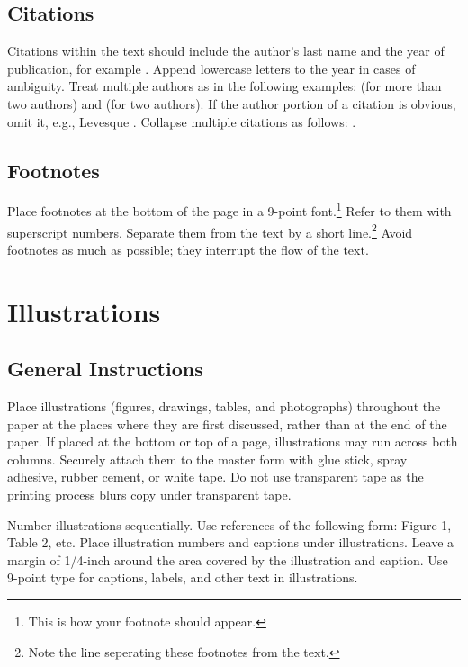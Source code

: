 \documentclass{article}
\begin{document}
\subsection{Citations}

Citations within the text should include the author's last name and
the year of publication, for example \cite{cheeseman:probability}.
Append lowercase letters to the year in cases of ambiguity.
Treat multiple authors as in the following examples:
\cite{abelson-et-al:scheme} (for more than two authors) and
\cite{brachman-schmolze:kl-one} (for two authors).
If the author portion of a citation is obvious, omit it,
e.g., Levesque .
Collapse multiple citations as follows:
\cite{levesque:functional-foundations,haugeland:mind-design}.%
\nocite{abelson-et-al:scheme}%
\nocite{brachman-schmolze:kl-one}%
\nocite{cheeseman:probability}%
\nocite{haugeland:mind-design}%
\nocite{lenat:heuristics}%
\nocite{levesque:functional-foundations}%
\nocite{levesque:belief}

\subsection{Footnotes} 
Place footnotes at the bottom of the page in a 9-point font.\footnote{This is how your footnote should appear.} 
Refer to them with superscript numbers. 
Separate them from the text by a short line.\footnote{Note the line seperating these footnotes from the text.}
Avoid footnotes as much as possible; they interrupt the flow of the text.

\section{Illustrations}

\subsection{General Instructions}
Place illustrations (figures, drawings, tables, and photographs) throughout the paper at the places where they are first discussed, rather than at the end of the paper. If placed at the bottom or top of a page, illustrations may run across
both columns. Securely attach them to the master form with glue stick, spray 
adhesive, rubber cement, or white tape. Do not use transparent tape as the 
printing process blurs copy under transparent tape.

Number illustrations sequentially. Use references of the following form: 
Figure 1, Table 2, etc. Place illustration numbers and captions under 
illustrations. Leave a margin of 1/4-inch around the area covered by the 
illustration and caption. Use 9-point type for captions, labels, and other 
text in illustrations.
\end{document}
